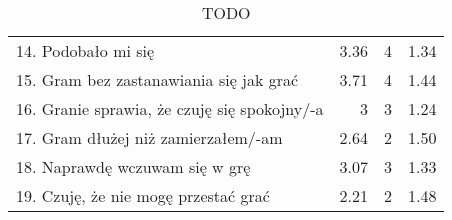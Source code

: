 \begin{table}[h!]
\begin{center}
\begin{tabular}{|m{10em}|r|r|r|}
            14. Podobało mi się                                               & 3.36          & 4       & 1.34           \\
            15. Gram bez zastanawiania się jak grać                           & 3.71          & 4       & 1.44           \\
            16. Granie sprawia, \newline że czuję się spokojny/-a             & 3             & 3       & 1.24           \\
            17. Gram dłużej \newline niż zamierzałem/-am                      & 2.64          & 2       & 1.50           \\
            18. Naprawdę wczuwam się w grę                                    & 3.07          & 3       & 1.33           \\
            19. Czuję, że nie mogę przestać grać                              & 2.21          & 2       & 1.48           \\
            \hline
        \end{tabular}
    \end{center}
    \caption{TODO}\label{tab1:ch7_6}
\end{table}

